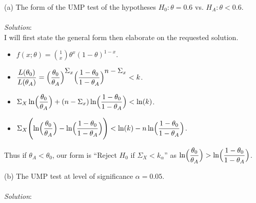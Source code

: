 \documentclass[12pt]{article}
\newcommand{\XB}{\color{black}}
\newcommand{\XBB}{\color{blue}}
\newcommand{\ds}{\displaystyle}
\begin{document}
\XBB\hrulefill\XB 
\vspace{5mm} 

(a) The form of the UMP test of the hypotheses $ H_{0} : \theta = 0.6 $ vs. $ H_{A} : \theta < 0.6 $. \\
\vspace{2.5mm} \\
\textit{Solution}:
\vspace{2.5mm} \\

\noindent
I will first state the general form then elaborate on the requested solution. \\

\begin{itemize}
    \item $ \ds f(x; \theta) = \binom{1}{x} \theta^{x} (1 - \theta)^{1 - x} $.
    \item $ \ds \frac{L(\theta_{0})}{L(\theta_{A})} = \Bigl( \frac{\theta_{0}}{\theta_{A}} \Bigr)^{\ds \Sigma_{x}} \Bigl( \frac{1 - \theta_{0}}{1 -\theta_{A}} \Bigr)^{\ds n - \Sigma_{x}} < k $.
    \item $ \ds \Sigma_{X} \ln\Bigl( \frac{\theta_{0}}{\theta_{A}} \Bigr) + (n - \Sigma_{x})\ln\Bigl( \frac{1 - \theta_{0}}{1 -\theta_{A}} \Bigr)  < \ln(k) $.
    \item $ \ds \Sigma_{X} \Biggl( \ln\Bigl( \frac{\theta_{0}}{\theta_{A}} \Bigr) - \ln\Bigl( \frac{1 - \theta_{0}}{1 -\theta_{A}} \Bigr) \Biggr) < \ln(k) - n\ln\Bigl( \frac{1 - \theta_{0}}{1 -\theta_{A}} \Bigr) $.
\end{itemize}

\noindent
Thus if $ \theta_{A} < \theta_{0} $, our form is ``Reject $ H_{0} $ if $ \Sigma_{X} < k_{\alpha} $'' as $ \ds \ln\Bigl( \frac{\theta_{0}}{\theta_{A}} \Bigr) > \ln\Bigl( \frac{1 - \theta_{0}}{1 -\theta_{A}} \Bigr) $. \\

\vspace{2.5mm}

(b) The UMP test at level of significance $ \alpha = 0.05 $. \\
\vspace{2.5mm} \\
\textit{Solution}:
\vspace{2.5mm} \\
\end{document}
